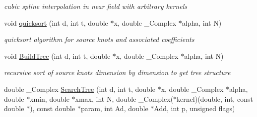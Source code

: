 \begin{CompactItemize}
\begin{CompactList}\small\item\em cubic spline interpolation in near field with arbitrary kernels \item\end{CompactList}\item 
\hypertarget{group__applications__fastsum_g7d3d3786f2e799dc1fa1704281f4a3fe}{
void \hyperlink{group__applications__fastsum_g7d3d3786f2e799dc1fa1704281f4a3fe}{quicksort} (int d, int t, double $\ast$x, double \_\-Complex $\ast$alpha, int N)}
\label{group__applications__fastsum_g7d3d3786f2e799dc1fa1704281f4a3fe}

\begin{CompactList}\small\item\em quicksort algorithm for source knots and associated coefficients \item\end{CompactList}\item 
\hypertarget{group__applications__fastsum_g61bae6836e2c586b9de245b664853174}{
void \hyperlink{group__applications__fastsum_g61bae6836e2c586b9de245b664853174}{BuildTree} (int d, int t, double $\ast$x, double \_\-Complex $\ast$alpha, int N)}
\label{group__applications__fastsum_g61bae6836e2c586b9de245b664853174}

\begin{CompactList}\small\item\em recursive sort of source knots dimension by dimension to get tree structure \item\end{CompactList}\item 
\hypertarget{group__applications__fastsum_g03b6b1585f02be878a4960e82b6f99ee}{
double \_\-Complex \hyperlink{group__applications__fastsum_g03b6b1585f02be878a4960e82b6f99ee}{SearchTree} (int d, int t, double $\ast$x, double \_\-Complex $\ast$alpha, double $\ast$xmin, double $\ast$xmax, int N, double \_\-Complex($\ast$kernel)(double, int, const double $\ast$), const double $\ast$param, int Ad, double $\ast$Add, int p, unsigned flags)}
\label{group__applications__fastsum_g03b6b1585f02be878a4960e82b6f99ee}


\end{CompactItemize}
